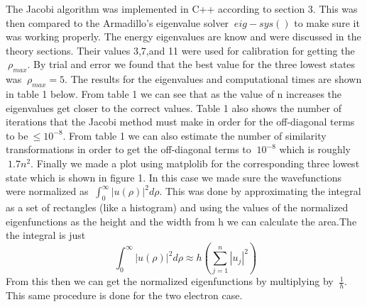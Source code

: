 \documentclass[11pt,a4wide]{article}
\begin{document}
The Jacobi algorithm was implemented in C++ according to section 3. This was then compared to the Armadillo's eigenvalue solver $\ eig-sys()$ to make sure it was working properly. The energy eigenvalues are know and were discussed in the theory sections. Their values 3,7,and 11 were used for calibration for getting the $\ \rho_{max}$. By trial and error we found that the best value for the three lowest states was $\ \rho_{max} = 5$. The results for the eigenvalues and computational times are shown in table 1 below. From table 1 we can see that as the value of n increases the eigenvalues get closer to the correct values. Table 1 also shows the number of iterations that the Jacobi method must make in order for the off-diagonal terms to be$\ \leq 10^{-8}$. From table 1 we can also estimate the number of similarity transformations in order to get the off-diagonal terms to $\ 10^{-8}$ which is roughly $\ 1.7n^2$. Finally we made a plot using matplolib for the corresponding three lowest state which is shown in figure 1. In this case we made sure the wavefunctions were normalized as $\ \int_0^\infty |u(\rho)|^2d\rho$. This was done by approximating the integral as a set of rectangles (like a histogram) and using the values of the normalized eigenfunctions as the height and the width from h we can calculate the area.The the integral is just 
\[
	\ \int_0^\infty |u(\rho)|^2d\rho \approx h\left(\sum_{j=1}^n |u_{j}|^2 \right)
\]
From this then we can get the normalized eigenfunctions by multiplying by $\ \frac{1}{h}$. This same procedure is done for the two electron case. 
\end{document}
